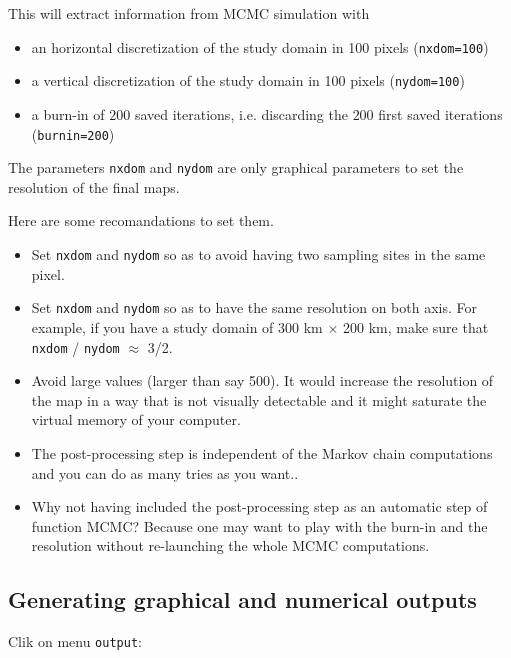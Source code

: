 \documentclass[a4paper,10pt]{article}
\begin{document}
\bigskip

This will extract information from  MCMC simulation with 
\begin{itemize}
\item an horizontal  discretization of the study domain in 100 pixels (\texttt{nxdom=100})
\item a vertical  discretization of the study domain in 100 pixels (\texttt{nydom=100})
\item a burn-in of $200$ saved  iterations, i.e. discarding the $200$ first saved iterations (\texttt{burnin=200})
\end{itemize}
The parameters \texttt{nxdom} and \texttt{nydom}  are only graphical parameters 
to set the resolution of the final maps. 


Here are some recomandations to set them.
\begin{itemize}
\item Set \texttt{nxdom} and \texttt{nydom} so as to avoid having two sampling sites in the same pixel.
\item Set \texttt{nxdom} and \texttt{nydom} so as to have the same resolution on both axis. For example, if you have 
a study domain of 300 km $\times$ 200 km, make sure that \texttt{nxdom} / \texttt{nydom} $\approx$ 3/2.
\item Avoid large values (larger than say 500). It would increase the resolution of the map in a way that is not visually detectable and it might saturate the virtual memory of your computer. 
\item The post-processing step is independent of the Markov chain computations and you can do as many tries as you want.. 
\item Why not having included the post-processing step as an automatic step of function MCMC? 
Because one may want to play with the burn-in and the resolution without re-launching the whole MCMC computations.
\end{itemize}


\clearpage
\subsection{Generating graphical and numerical outputs}

Clik on menu \texttt{output}:\\
\end{document}

